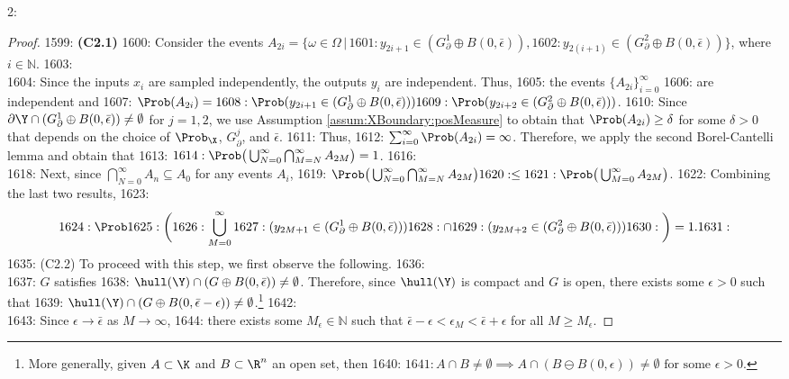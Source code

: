 2: \documentclass[12pt]{l4dc2022} %
\begin{document}
\begin{proof}
1599: \textbf{(C2.1) }
1600: Consider the events $A_{2i}=\{\omega\in\Omega\,|\,
1601: y_{2i+1}\in (G_\partial^1\oplus B(0,\bar{\epsilon})),
1602: y_{2(i+1)}\in (G_\partial^2\oplus B(0,\bar{\epsilon}))\}$, where $i\in\mathbb{N}$.
1603: \\
1604: Since the inputs $x_i$ are sampled independently, the outputs $y_i$ are independent. Thus, 
1605: the events $\{A_{2i}\}_{i=0}^\infty$ 
1606: are independent and  
1607: $\Prob(A_{2i})=
1608: \Prob(y_{2i+1}\in (G_\partial^1\oplus B(0,\bar{\epsilon})))
1609: \Prob(y_{2i+2}\in (G_\partial^2\oplus B(0,\bar{\epsilon})))$. 
1610: Since $\partial\Y\cap (G_\partial^1\oplus B(0,\bar{\epsilon})) \neq \emptyset$ for $j=1,2$, we use Assumption \ref{assum:XBoundary:posMeasure} to obtain that $\Prob(A_{2i}) \geq \delta$ for some $\delta>0$ that depends on the choice of $\Prob_\X$, $G_\partial^j$, and $\bar\epsilon$. 
1611: Thus, 
1612: $\sum_{i=0}^\infty\Prob(A_{2i})=\infty$. Therefore, we apply the second Borel-Cantelli lemma and obtain that 
1613: $
1614: \Prob\big(\bigcup_{N=0}^\infty\bigcap_{M=N}^\infty A_{2M}\big) = 1$.
1616: \\
1618: Next, since $\bigcap_{N=0}^\infty A_n \subseteq A_0$ for any events $A_i$, 
1619: $\Prob\big(\bigcup_{N=0}^\infty\bigcap_{M=N}^\infty A_{2M}\big) 
1620:  \leq 
1621:  \Prob\big(\bigcup_{M=0}^\infty A_{2M}\big) $. 
1622:  Combining the last two results, 
1623: \begin{equation}\label{eq:prob_union_xm_in_G_equals_1}
1624: \Prob
1625: \bigg(
1626: 	\bigcup_{M=0}^\infty 
1627: (y_{2M+1}\in (G_\partial^1\oplus B(0,\bar{\epsilon})))
1628: \cap 
1629: (y_{2M+2}\in (G_\partial^2\oplus B(0,\bar{\epsilon})))
1630: \bigg) = 1.
1631: \end{equation}
1635: (C2.2) To proceed with this step, we first observe the following. 
1636: \\
1637: $G$ satisfies 
1638: $\hull(\Y)\cap (G\oplus B(0,\bar{\epsilon}))\neq \emptyset$. Therefore, since $\hull(\Y)$ is compact and $G$ is open, there exists some $\epsilon>0$ such that  
1639: $\hull(\Y)\cap (G\oplus B(0,\bar{\epsilon}-\epsilon))\neq \emptyset$.\footnote{More generally, given $A\subset\K$ and $B\subset\R^n$ an open set, then 
1640: $
1641: A\cap B \neq\emptyset\implies A\cap(B\ominus B(0,\epsilon))\neq\emptyset \text{ for some $\epsilon>0$.}$}
1642: \\
1643: Since $\epsilon\rightarrow\bar{\epsilon}$ as $M\rightarrow\infty$, 
1644: there exists some $M_\epsilon\in\mathbb{N}$ such that $\bar{\epsilon}-\epsilon<\epsilon_M<\bar{\epsilon}+\epsilon$ for all $M\geq M_\epsilon$. 

\end{proof}
\end{document}
